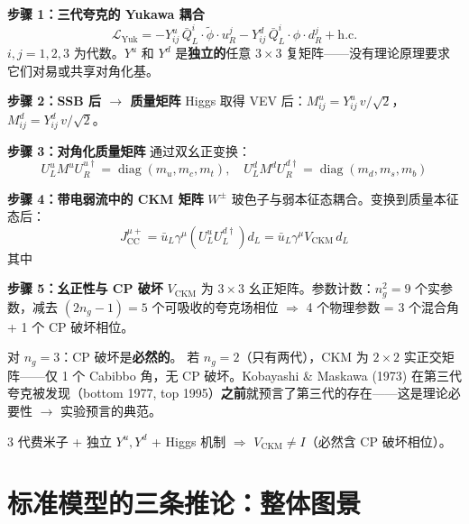 \begin{derivationbox}

\noindent\textbf{步骤 1：三代夸克的 Yukawa 耦合}
\begin{equation}
\mathcal{L}_{\text{Yuk}} = -Y^{u}_{ij}\,\bar{Q}^i_L\cdot\tilde{\phi}\cdot u^j_R - Y^{d}_{ij}\,\bar{Q}^i_L\cdot\phi\cdot d^j_R + \text{h.c.}
\end{equation}
$i,j=1,2,3$ 为代数。$Y^u$ 和 $Y^d$ 是\textbf{独立的}任意 $3\times3$ 复矩阵——没有理论原理要求它们对易或共享对角化基。

\noindent\textbf{步骤 2：SSB 后 $\to$ 质量矩阵}
Higgs 取得 VEV 后：$M^u_{ij} = Y^u_{ij}\,v/\sqrt{2}$，$M^d_{ij} = Y^d_{ij}\,v/\sqrt{2}$。

\noindent\textbf{步骤 3：对角化质量矩阵}
通过双幺正变换：
\begin{equation}
U^u_L M^u U^{u\dagger}_R = \operatorname{diag}(m_u,m_c,m_t),\quad
U^d_L M^d U^{d\dagger}_R = \operatorname{diag}(m_d,m_s,m_b)
\end{equation}

\noindent\textbf{步骤 4：带电弱流中的 CKM 矩阵}
$W^\pm$ 玻色子与弱本征态耦合。变换到质量本征态后：
\begin{equation}
J^{\mu+}_{\text{CC}} = \bar{u}_L \gamma^\mu (U^u_L U^{d\dagger}_L) d_L = \bar{u}_L \gamma^\mu V_{\text{CKM}}\, d_L
\end{equation}
其中 

\noindent\textbf{步骤 5：幺正性与 CP 破坏}
$V_{\text{CKM}}$ 为 $3\times3$ 幺正矩阵。参数计数：$n_g^2=9$ 个实参数，减去 $(2n_g-1)=5$ 个可吸收的夸克场相位 $\Rightarrow$ 4 个物理参数 = 3 个混合角 + 1 个 CP 破坏相位。

对 $n_g=3$：CP 破坏是\textbf{必然的}。\fbox{[N]} 若 $n_g=2$（只有两代），CKM 为 $2\times2$ 实正交矩阵——仅 1 个 Cabibbo 角，无 CP 破坏。Kobayashi \& Maskawa (1973) 在第三代夸克被发现（bottom 1977, top 1995）\textbf{之前}就预言了第三代的存在——这是理论必要性 $\to$ 实验预言的典范。

\fbox{[S]} 3 代费米子 + 独立 $Y^u, Y^d$ + Higgs 机制 $\Rightarrow$ $V_{\text{CKM}} \neq I$（必然含 CP 破坏相位）。

\end{derivationbox}

\section{标准模型的三条推论：整体图景}

